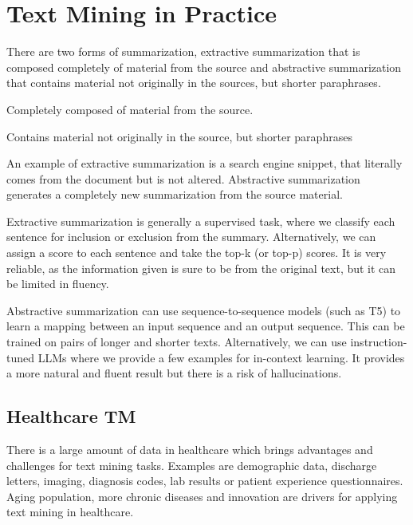 \section{Text Mining in Practice}

There are two forms of summarization, extractive summarization that is
composed completely of material from the source and abstractive summarization
that contains material not originally in the sources, but shorter paraphrases.

\begin{definition}
  Completely composed of material from the source.
\end{definition}

\begin{definition}
  Contains material not originally in the source, but shorter paraphrases
\end{definition}

An example of extractive summarization is a search engine snippet,
that literally
comes from the document but is not altered. Abstractive summarization
generates a
completely new summarization from the source material.

Extractive summarization is generally a supervised task, where we
classify each sentence
for inclusion or exclusion from the summary. Alternatively, we can
assign a score to
each sentence and take the top-k (or top-p) scores. It is very
reliable, as the information
given is sure to be from the original text, but it can be limited in fluency.

Abstractive summarization can use sequence-to-sequence models (such
as T5) to learn a mapping
between an input sequence and an output sequence. This can be trained
on pairs of
longer and shorter texts. Alternatively, we can use instruction-tuned
LLMs where we
provide a few examples for in-context learning. It provides a more
natural and fluent
result but there is a risk of hallucinations.

\subsection{Healthcare TM}

There is a large amount of data in healthcare which brings advantages
and challenges
for text mining tasks. Examples are demographic data, discharge
letters, imaging, diagnosis codes,
lab results or patient experience questionnaires. Aging population,
more chronic diseases and
innovation are drivers for applying text mining in healthcare.

